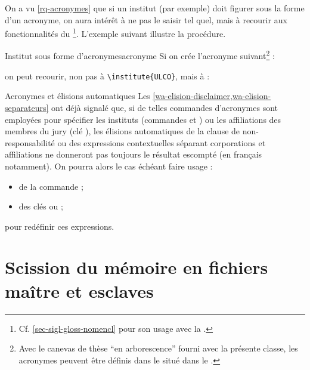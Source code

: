 On a vu \vref{rq-acronymes} que si un institut (par exemple) doit figurer
sous la forme d'un acronyme, on aura intérêt à ne pas le saisir tel
quel, mais à recourir aux fonctionnalités du
\footnote{Cf. \vref{sec-sigl-gloss-nomencl} pour
  son usage avec la \yatCl.}. L'exemple suivant illustre la
procédure.
%
\begin{dbexample}{Institut sous forme d'acronymes}{acronyme}
  Si on crée l'acronyme suivant\footnote{Avec le canevas de thèse \enquote{en
      arborescence} fourni avec la présente classe, les acronymes peuvent être
    définis dans le \File{\acronymsfile} situé dans le
    \Folder{\auxiliarydirectory}.} :
\begin{preamblecode}[]
\end{preamblecode}
on peut recourir, non pas à \lstinline[deletekeywords={[5]institute}]|\institute{ULCO}|, mais à :
\begin{preamblecode}[listing options={deletekeywords={[5]institute}}]
\end{preamblecode}
\end{dbexample}

\begin{dbremark}{Acronymes et élisions automatiques}{}
  Les \vref{wa-elision-disclaimer,wa-elision-separateurs} ont déjà
  signalé que, si de telles commandes d'acronymes sont employées pour spécifier
  les instituts (commandes  et ) ou les
  affiliations des membres du jury (clé ), les élisions
  automatiques de la clause de non-responsabilité ou des expressions
  contextuelles séparant corporations et affiliations ne donneront pas toujours le
  résultat escompté (en français notamment). On pourra alors le cas échéant
  faire usage :
  \begin{itemize}
  \item de la commande  ;
  \item des clés  ou  ;
  \end{itemize}
  pour redéfinir ces expressions.
\end{dbremark}

\section{Scission du mémoire en fichiers maître et esclaves}
\label{sec-repart-du-memo}

